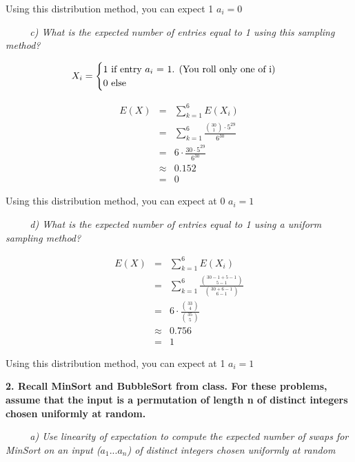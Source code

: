 \documentclass[12pt, letterpaper]{article}
\begin{document}
Using this distribution method, you can expect 1 \(a_i = 0\)

\-\ \newline
\-\ \newline
\-\ \it{ c) What is the expected number of entries equal to 1 using this sampling method? }

\[ 
X_i = 
\begin{cases} 
      1 \mbox{\textnormal{ if entry \(a_i\) = 1. (You roll only one of i)}} \\
      0 \mbox{\textnormal{ else}} \\
   \end{cases}
\]

\begin{eqnarray}
    E(X) &=& \sum_{k=1}^{6} E(X_i) \\
    &=& \sum_{k=1}^{6} \frac{{30 \choose 1} \cdot 5^{29}}{6^{30}} \\
    &=& 6 \cdot \frac{ 30 \cdot 5^{29}}{6^{30}} \\
    &\approx& 0.152 \\
    &=& 0
\end{eqnarray}

Using this distribution method, you can expect at 0 \(a_i = 1\)


\-\ \newline
\-\ \newline
\-\ \it{ d) What is the expected number of entries equal to 1 using a uniform sampling method? }

\begin{eqnarray}
    E(X) &=& \sum_{k=1}^{6} E(X_i) \\
    &=& \sum_{k=1}^{6} \frac{ {30 - 1 + 5 - 1 \choose  5 - 1} }{ {30 + 6 - 1 \choose 6 - 1} } \\
    &=& 6 \cdot \frac{ {33 \choose 4} }{ {35 \choose 5 } } \\
    &\approx& 0.756 \\
    &=& 1
\end{eqnarray}

Using this distribution method, you can expect at 1 \(a_i = 1\)

\newpage

\bf{ 2. Recall MinSort and BubbleSort from class. For these problems, assume that the input is a
permutation of length n of distinct integers chosen uniformly at random. }

\-\ \newline
\-\ \newline
\-\ \it{ a) Use linearity of expectation to compute the expected number of swaps for MinSort on an input (\(a_1...a_n\)) of distinct integers chosen uniformly at random }
\end{document}
